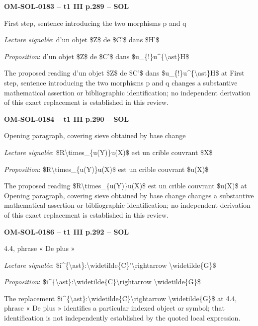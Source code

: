 \par\noindent\textbf{OM-SOL-0183 -- t1 III p.289 -- SOL}\par
First step, sentence introducing the two morphisms p and q\par
\emph{Lecture signalée}: d'un objet \$Z\$ de \$C'\$ dans \$H'\$\par
\emph{Proposition}: d'un objet \$Z\$ de \$C'\$ dans \$u\_\{!\}u\textasciicircum{}\{\textbackslash{}ast\}H\$\par
The proposed reading d'un objet \$Z\$ de \$C'\$ dans \$u\_\{!\}u\textasciicircum{}\{\textbackslash{}ast\}H\$ at First step, sentence introducing the two morphisms p and q changes a substantive mathematical assertion or bibliographic identification; no independent derivation of this exact replacement is established in this review.\par
\par\noindent\textbf{OM-SOL-0184 -- t1 III p.290 -- SOL}\par
Opening paragraph, covering sieve obtained by base change\par
\emph{Lecture signalée}: \$R\textbackslash{}times\_\{u(Y)\}u(X)\$ est un crible couvrant \$X\$\par
\emph{Proposition}: \$R\textbackslash{}times\_\{u(Y)\}u(X)\$ est un crible couvrant \$u(X)\$\par
The proposed reading \$R\textbackslash{}times\_\{u(Y)\}u(X)\$ est un crible couvrant \$u(X)\$ at Opening paragraph, covering sieve obtained by base change changes a substantive mathematical assertion or bibliographic identification; no independent derivation of this exact replacement is established in this review.\par
\par\noindent\textbf{OM-SOL-0186 -- t1 III p.292 -- SOL}\par
4.4, phrase « De plus »\par
\emph{Lecture signalée}: \$i\textasciicircum{}\{\textbackslash{}ast\}:\textbackslash{}widetilde\{C\}'\textbackslash{}rightarrow \textbackslash{}widetilde\{G\}\$\par
\emph{Proposition}: \$i\textasciicircum{}\{\textbackslash{}ast\}:\textbackslash{}widetilde\{C\}\textbackslash{}rightarrow \textbackslash{}widetilde\{G\}\$\par
The replacement \$i\textasciicircum{}\{\textbackslash{}ast\}:\textbackslash{}widetilde\{C\}\textbackslash{}rightarrow \textbackslash{}widetilde\{G\}\$ at 4.4, phrase « De plus » identifies a particular indexed object or symbol; that identification is not independently established by the quoted local expression.\par
